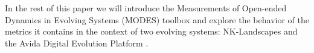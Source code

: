 \documentclass[letterpaper]{article}
\begin{document}


In the rest of this paper we will introduce the Measurements of Open-ended Dynamics in Evolving Systems (MODES) toolbox and explore the behavior of the metrics it contains in the context of two evolving systems: NK-Landscapes \citep{kauffman_towards_1987} and the Avida Digital Evolution Platform \citep{ofria_avida:_2004}.


\end{document}
